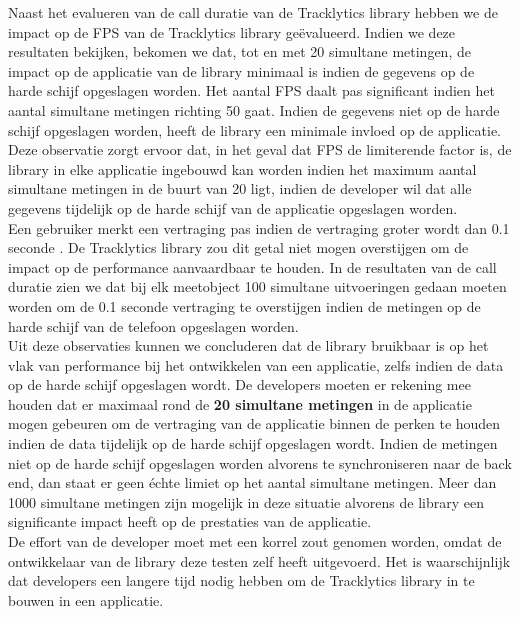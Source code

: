 Naast het evalueren van de call duratie van de Tracklytics library hebben we de impact op de FPS van de Tracklytics library ge\"evalueerd. Indien we deze resultaten bekijken, bekomen we dat, tot en met 20 simultane metingen, de impact op de applicatie van de library minimaal is indien de gegevens op de harde schijf opgeslagen worden. Het aantal FPS daalt pas significant indien het aantal simultane metingen richting 50 gaat. Indien de gegevens niet op de harde schijf opgeslagen worden, heeft de library een minimale invloed op de applicatie. Deze observatie zorgt ervoor dat, in het geval dat FPS de limiterende factor is, de library in elke applicatie ingebouwd kan worden indien het maximum aantal simultane metingen in de buurt van 20 ligt, indien de developer wil dat alle gegevens tijdelijk op de harde schijf van de applicatie opgeslagen worden. \\ 

Een gebruiker merkt een vertraging pas indien de vertraging groter wordt dan 0.1 seconde \cite{nielsen1994usability}. De Tracklytics library zou dit getal niet mogen overstijgen om de impact op de performance aanvaardbaar te houden. In de resultaten van de call duratie zien we dat bij elk meetobject 100 simultane uitvoeringen gedaan moeten worden om de 0.1 seconde vertraging te overstijgen indien de metingen op de harde schijf van de telefoon opgeslagen worden. \\


Uit deze observaties kunnen we concluderen dat de library bruikbaar is op het vlak van performance bij het ontwikkelen van een applicatie, zelfs indien de data op de harde schijf opgeslagen wordt. De developers moeten er rekening mee houden dat er maximaal rond de \textbf{20 simultane metingen} in de applicatie mogen gebeuren om de vertraging van de applicatie binnen de perken te houden indien de data tijdelijk op de harde schijf opgeslagen wordt. Indien de metingen niet op de harde schijf opgeslagen worden alvorens te synchroniseren naar de back end, dan staat er geen \'echte limiet op het aantal simultane metingen. Meer dan 1000 simultane metingen zijn mogelijk in deze situatie alvorens de library een significante impact heeft op de prestaties van de applicatie. \\

De effort van de developer moet met een korrel zout genomen worden, omdat de ontwikkelaar van de library deze testen zelf heeft uitgevoerd. Het is waarschijnlijk dat developers een langere tijd nodig hebben om de Tracklytics library in te bouwen in een applicatie. \\












